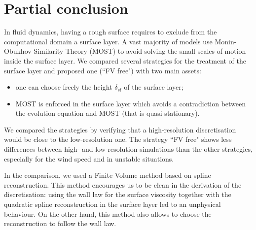 \section{Partial conclusion}
In fluid dynamics, having a rough surface requires to exclude from
the computational domain a surface layer. A vast majority of models
use Monin-Obukhov Similarity Theory (MOST)
to avoid solving the small scales of motion inside the surface layer.
We compared several strategies for the treatment of the surface layer
and proposed one (``FV free") with two main assets:
\begin{itemize}
	\item one can choose freely the height $\delta_{sl}$
		of the surface layer;
	\item MOST is enforced in the surface layer which avoids
		a contradiction between the evolution equation and
		MOST (that is quasi-stationary).
\end{itemize}
We compared the strategies by verifying that a high-resolution
discretisation would be close to the low-resolution one.
The strategy ``FV free" shows less differences between
high- and low-resolution simulations than the other strategies,
especially for the wind speed and in unstable situations.
\par
In the comparison, we used a Finite Volume method based on spline
reconstruction. This method encourages us to be
clean in the derivation of the discretisation: using the wall law
for the surface viscosity together with the quadratic spline
reconstruction in the surface layer led to an unphysical behaviour.
On the other hand, this method also allows to choose the
reconstruction to follow the wall law.
